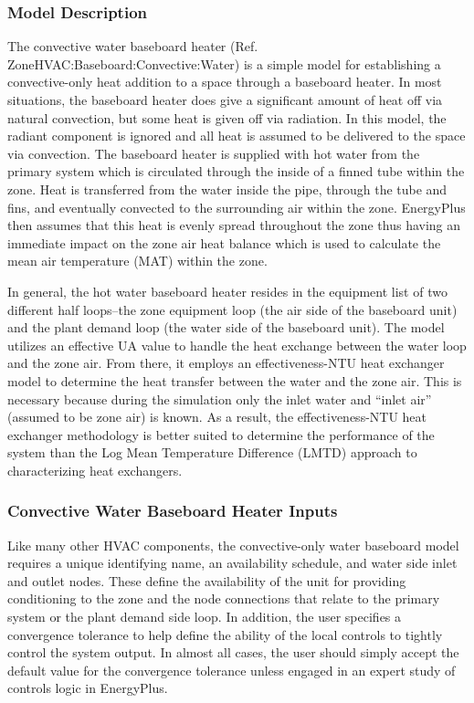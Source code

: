 \subsubsection{Model Description}\label{model-description-003}

The convective water baseboard heater (Ref. ZoneHVAC:Baseboard:Convective:Water) is a simple model for establishing a convective-only heat addition to a space through a baseboard heater. In most situations, the baseboard heater does give a significant amount of heat off via natural convection, but some heat is given off via radiation. In this model, the radiant component is ignored and all heat is assumed to be delivered to the space via convection. The baseboard heater is supplied with hot water from the primary system which is circulated through the inside of a finned tube within the zone. Heat is transferred from the water inside the pipe, through the tube and fins, and eventually convected to the surrounding air within the zone. EnergyPlus then assumes that this heat is evenly spread throughout the zone thus having an immediate impact on the zone air heat balance which is used to calculate the mean air temperature (MAT) within the zone.

In general, the hot water baseboard heater resides in the equipment list of two different half loops--the zone equipment loop (the air side of the baseboard unit) and the plant demand loop (the water side of the baseboard unit). The model utilizes an effective UA value to handle the heat exchange between the water loop and the zone air. From there, it employs an effectiveness-NTU heat exchanger model to determine the heat transfer between the water and the zone air. This is necessary because during the simulation only the inlet water and ``inlet air'' (assumed to be zone air) is known. As a result, the effectiveness-NTU heat exchanger methodology is better suited to determine the performance of the system than the Log Mean Temperature Difference (LMTD) approach to characterizing heat exchangers.

\subsubsection{Convective Water Baseboard Heater Inputs}\label{convective-water-baseboard-heater-inputs}

Like many other HVAC components, the convective-only water baseboard model requires a unique identifying name, an availability schedule, and water side inlet and outlet nodes. These define the availability of the unit for providing conditioning to the zone and the node connections that relate to the primary system or the plant demand side loop. In addition, the user specifies a convergence tolerance to help define the ability of the local controls to tightly control the system output. In almost all cases, the user should simply accept the default value for the convergence tolerance unless engaged in an expert study of controls logic in EnergyPlus.


